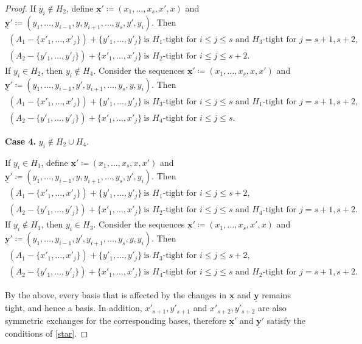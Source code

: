 \documentclass[11pt,a4paper]{article}
\theoremstyle{plain}
\theoremstyle{definition}
\newenvironment{claimproof}[1][\proofname]
  {%
    \proof[#1]%
      \renewcommand*\qedsymbol{$\bullet$}%
  }
  {%
    \endproof%
  }
\newcommand{\ul}[1]{\underline{\mathbf{#1}}}
\begin{document}
\begin{proof}
\begin{claimproof}
\noindent If $y_i \notin H_2$, define $\ul{x}'\coloneqq(x_1,\dots,x_s,x',x)$ and $\ul{y}'\coloneqq(y_1,\dots,y_{i-1},y,y_{i+1},\dots,y_s,y',y_i)$. Then 
\begin{gather*}
    (A_1-\{x'_1,\dots,x'_j\})+\{y'_1,\dots,y'_j\}\ \text{is $H_1$-tight for $i \le j \le s$ and $H_3$-tight for $j=s+1,s+2$},\\
    (A_2-\{y'_1,\dots,y'_j\})+\{x'_1,\dots,x'_j\}\ \text{is $H_2$-tight for $i \le j \le s+2$}.
\end{gather*}  
If $y_i\in H_2$, then $y_i\notin H_4$. Consider the sequences $\ul{x}'\coloneqq(x_1,\dots,x_s,x,x')$ and $\ul{y}'\coloneqq(y_1,\dots,y_{i-1},\allowbreak y',y_{i+1},\dots,y_s,y,y_i)$. Then 
\begin{gather*}
    (A_1-\{x'_1,\dots,x'_j\})+\{y'_1,\dots,y'_j\}\ \text{is $H_3$-tight for $i \le j \le s$ and $H_1$-tight for $j=s+1,s+2$},\\
    (A_2-\{y'_1,\dots,y'_j\})+\{x'_1,\dots,x'_j\}\ \text{is $H_4$-tight for $i \le j \le s$}.
\end{gather*}  

\noindent\textbf{Case 4.} $y_i \notin H_2 \cup H_4$.

\noindent If $y_i \in H_1$, define $\ul{x}'\coloneqq(x_1,\dots,x_s,x,x')$ and $\ul{y}'\coloneqq(y_1,\dots,y_{i-1},y,y_{i+1},\dots,y_s,y',y_i)$. Then 
\begin{gather*}
    (A_1-\{x'_1,\dots,x'_j\})+\{y'_1,\dots,y'_j\}\ \text{is $H_1$-tight for $i \le j \le s+2$},\\
    (A_2-\{y'_1,\dots,y'_j\})+\{x'_1,\dots,x'_j\}\ \text{is $H_2$-tight for $i \le j \le s$ and $H_4$-tight for $j=s+1,s+2$}.
\end{gather*}  
If $y_i\notin H_1$, then $y_i\in H_3$. Consider the sequences $\ul{x}'\coloneqq(x_1,\dots,x_s,x',x)$ and $\ul{y}'\coloneqq(y_1,\dots,y_{i-1},\allowbreak y',y_{i+1},\dots,y_s,y,y_i)$. Then 
\begin{gather*}
    (A_1-\{x'_1,\dots,x'_j\})+\{y'_1,\dots,y'_j\}\ \text{is $H_3$-tight for $i \le j \le s+2$},\\
    (A_2-\{y'_1,\dots,y'_j\})+\{x'_1,\dots,x'_j\}\ \text{is $H_4$-tight for $i \le j \le s$ and $H_2$-tight for $j=s+1,s+2$}.
\end{gather*}  

By the above, every basis that is affected by the changes in $\ul{x}$ and $\ul{y}$ remains tight, and hence a basis. In addition, $x'_{s+1},y'_{s+1}$ and $x'_{s+2},y'_{s+2}$ are also symmetric exchanges for the corresponding bases, therefore $\ul{x}'$ and $\ul{y}'$ satisfy the conditions of \ref{star}.


\end{claimproof}
\end{proof}
\end{document}
